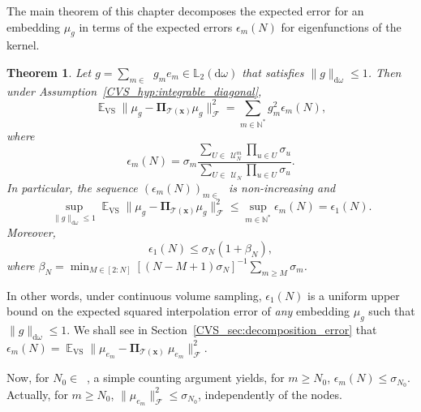 \documentclass[twoside,11pt]{book}
\newtheorem{theorem}{Theorem}
\numberwithin{theorem}{chapter}
\numberwithin{definition}{chapter}
\numberwithin{proposition}{chapter}
\numberwithin{corollary}{chapter}
\numberwithin{example}{chapter}
\numberwithin{lemma}{chapter}
\numberwithin{assumption}{chapter}
\numberwithin{equation}{chapter}
\numberwithin{figure}{chapter}
\DeclareMathOperator{\Span}{\mathrm{Span}}
\DeclareMathOperator{\VS}{\mathrm{VS}}
\DeclareMathOperator{\EX}{\mathbb{E}}
\DeclareMathOperator{\F}{\mathcal{F}}
\DeclareMathOperator{\Ns}{\mathbb{N}^{*}}
\def\UN{\:\mathcal{U}_N}
\def\UNm{\:\mathcal{U}_N^m}
\begin{document}
The main theorem of this chapter decomposes the expected error for an embedding $\mu_g$ in terms of the expected errors $\epsilon_m(N)$ for eigenfunctions of the kernel.
\begin{theorem}\label{CVS_thm:main_result_1}
Let $\displaystyle g = \sum\limits_{m\in \Ns} g_m e_m \in \mathbb{L}_{2}(\mathrm{d}\omega)$ that satisfies $\| g\|_{\mathrm{d}\omega} \leq 1$.  Then under Assumption~\ref{CVS_hyp:integrable_diagonal},
\begin{equation}\label{CVS_eq:main_result_EX_VS_err_mu}
\EX_{\VS} \|\mu_{g} - \bm{\Pi}_{\mathcal{T}(\bm{x})} \mu_{g}\|_{\F}^{2} = \sum\limits_{m \in \mathbb{N}^{*}} g_{m}^{2} \epsilon_{m}(N),
\end{equation}
where 
\begin{equation}
\epsilon_{m}(N) = \sigma_{m} \frac{ \sum\limits_{  U \in \: \UNm} \prod\limits_{u \in U} \sigma_{u}}{\sum\limits_{ U \in \: \UN} \prod\limits_{u \in U} \sigma_{u} } .
\end{equation}
In particular, the sequence $(\epsilon_m(N))_{m \in \Ns}$ is non-increasing and
\begin{equation}\label{CVS_eq:upper_bound_sup_epsilon}
\sup_{\| g\|_{\mathrm{d}\omega} \leq 1} \EX_{\VS} \|\mu_{g} - \bm{\Pi}_{\mathcal{T}(\bm{x})} \mu_{g}\|_{\F}^{2} \leq \sup\limits_{m \in \mathbb{N}^{*}} \epsilon_{m}(N) = \epsilon_1(N).
\end{equation}
Moreover,
\begin{equation}\label{CVS_eq:ineq_r_N}
\epsilon_{1}(N) \leq \sigma_{N} \left(1+ \beta_{N}\right),
\end{equation}
where $\displaystyle \beta_{N} = \min_{M \in [2:N]} \left[(N-M+1)\sigma_N\right]^{-1} \sum_{m \geq M} \sigma_m$.
\end{theorem}

In other words, under continuous volume sampling, $\epsilon_{1}(N)$ is a uniform upper bound on the expected squared interpolation error of \emph{any} embedding $\mu_{g}$ such that $\|g\|_{\mathrm{d}\omega} \leq 1$. We shall see in Section~\ref{CVS_sec:decomposition_error} that $\epsilon_m(N) = \EX_{\VS}\|\mu_{e_{m}}-\bm{\Pi}_{\mathcal{T}(\bm{x})}~\mu_{e_{m}}\|_{\F}^{2}$.

Now, for $N_{0} \in \Ns$, a simple counting argument yields, for $m \geq N_{0}$, $\epsilon_{m}(N) \leq \sigma_{N_{0}}$. Actually, for $m \geq N_{0}$, $\|\mu_{e_{m}}\|_{\F}^{2} \leq \sigma_{N_{0}}$, independently of the nodes.

\end{document}
